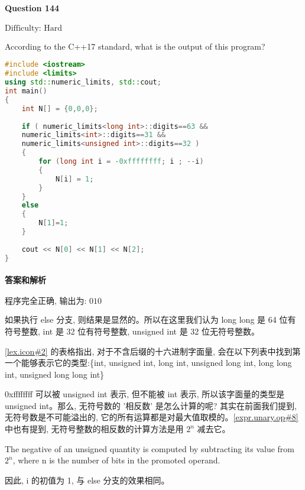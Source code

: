 \documentclass{article}
\begin{document}
	\paragraph*{Question 144} $\boxed{\text{Difficulty: Hard}} $			
	
	According to the C++17 standard, what is the output of this program?
	
	\begin{lstlisting}[language=C++]  		
#include <iostream>
#include <limits>
using std::numeric_limits, std::cout;
int main()
{
	int N[] = {0,0,0};
	
	if ( numeric_limits<long int>::digits==63 &&
	numeric_limits<int>::digits==31 &&
	numeric_limits<unsigned int>::digits==32 )
	{
		for (long int i = -0xffffffff; i ; --i)
		{
			N[i] = 1;
		}
	}
	else
	{  
		N[1]=1;
	}
	
	cout << N[0] << N[1] << N[2];
}
	\end{lstlisting}
	
	
	\paragraph*{答案和解析} $\boxed{\text{程序完全正确, 输出为: 010}} $
	
	如果执行 else 分支, 则结果是显然的。所以在这里我们认为 long long 是 64 位有符号整数, int 是 32 位有符号整数, unsigned int 是 32 位无符号整数。
	
	\href{https://timsong-cpp.github.io/cppwp/n4659/lex.icon#2}{[lex.icon\#2]} 的表格指出, 对于不含后缀的十六进制字面量, 会在以下列表中找到第一个能够表示它的类型:\{int, unsigned int, long int, unsigned long int, long long int, unsigned long long int\} 
	
	0xffffffff 可以被 unsigned int 表示, 但不能被 int 表示, 所以该字面量的类型是 unsigned int。那么, 无符号数的 '相反数' 是怎么计算的呢? 其实在前面我们提到, 无符号数是不可能溢出的, 它的所有运算都是对最大值取模的。\href{https://timsong-cpp.github.io/cppwp/n4659/expr.unary.op#8}{[expr.unary.op\#8]} 中也有提到, 无符号整数的相反数的计算方法是用 $2^n$ 减去它。
	
	\begin{lightgrayleftbar}
		The negative of an unsigned quantity is computed by subtracting its value from $2^n$, where n is the number of bits in the promoted operand. 
	\end{lightgrayleftbar}

	因此, i 的初值为 1, 与 else 分支的效果相同。
\end{document}
